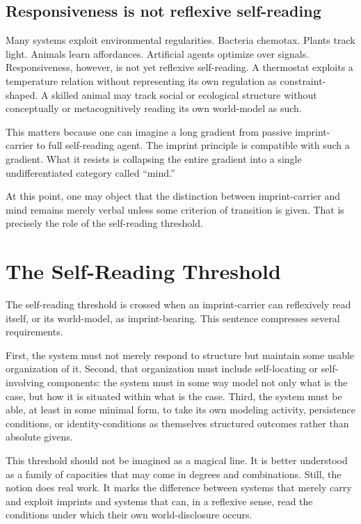 \documentclass[12pt]{article}
\begin{document}
\subsection{Responsiveness is not reflexive self-reading}

Many systems exploit environmental regularities. Bacteria chemotax. Plants track light. Animals learn affordances. Artificial agents optimize over signals. Responsiveness, however, is not yet reflexive self-reading. A thermostat exploits a temperature relation without representing its own regulation as constraint-shaped. A skilled animal may track social or ecological structure without conceptually or metacognitively reading its own world-model as such.

This matters because one can imagine a long gradient from passive imprint-carrier to full self-reading agent. The imprint principle is compatible with such a gradient. What it resists is collapsing the entire gradient into a single undifferentiated category called ``mind.''

At this point, one may object that the distinction between imprint-carrier and mind remains merely verbal unless some criterion of transition is given. That is precisely the role of the self-reading threshold.

\section{The Self-Reading Threshold}

The self-reading threshold is crossed when an imprint-carrier can reflexively read itself, or its world-model, as imprint-bearing. This sentence compresses several requirements.

First, the system must not merely respond to structure but maintain some usable organization of it. Second, that organization must include self-locating or self-involving components: the system must in some way model not only what is the case, but how it is situated within what is the case. Third, the system must be able, at least in some minimal form, to take its own modeling activity, persistence conditions, or identity-conditions as themselves structured outcomes rather than absolute givens.

This threshold should not be imagined as a magical line. It is better understood as a family of capacities that may come in degrees and combinations. Still, the notion does real work. It marks the difference between systems that merely carry and exploit imprints and systems that can, in a reflexive sense, read the conditions under which their own world-disclosure occurs.
\end{document}
